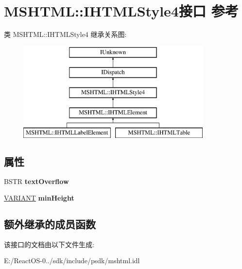 \hypertarget{interface_m_s_h_t_m_l_1_1_i_h_t_m_l_style4}{}\section{M\+S\+H\+T\+ML\+:\+:I\+H\+T\+M\+L\+Style4接口 参考}
\label{interface_m_s_h_t_m_l_1_1_i_h_t_m_l_style4}
类 M\+S\+H\+T\+ML\+:\+:I\+H\+T\+M\+L\+Style4 继承关系图\+:\begin{figure}[H]
\begin{center}
\leavevmode
\includegraphics[height=5.000000cm]{interface_m_s_h_t_m_l_1_1_i_h_t_m_l_style4}
\end{center}
\end{figure}
\subsection*{属性}
\begin{DoxyCompactItemize}
\item 
\mbox{\label{interface_m_s_h_t_m_l_1_1_i_h_t_m_l_style4_ac5b7c14ff6a316dd8ca6ff8c56773fca}} 
B\+S\+TR {\bfseries text\+Overflow}
\item 
\mbox{\label{interface_m_s_h_t_m_l_1_1_i_h_t_m_l_style4_a592d5d70fedf0357ed26892d0e05f5af}} 
\hyperlink{structtag_v_a_r_i_a_n_t}{V\+A\+R\+I\+A\+NT} {\bfseries min\+Height}
\end{DoxyCompactItemize}
\subsection*{额外继承的成员函数}


该接口的文档由以下文件生成\+:\begin{DoxyCompactItemize}
\item 
E\+:/\+React\+O\+S-\/0../sdk/include/psdk/mshtml.\+idl\end{DoxyCompactItemize}
